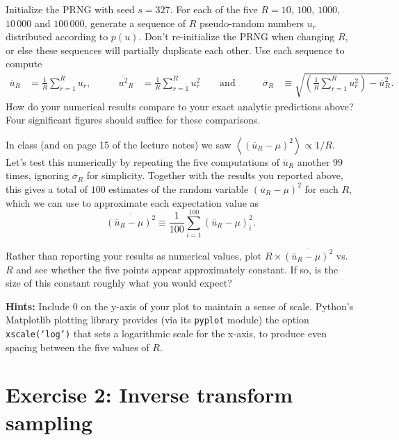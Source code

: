 \documentclass[12 pt]{article} %
\newcommand{\ubar}{\ensuremath{\overline u} }
\newcommand{\sibar}{\ensuremath{\overline\sigma} }
\newcommand{\vev}[1]{\ensuremath{\left\langle #1 \right\rangle} }
\newcommand{\showmarks}[1]{\rightline{\texttt{[#1 marks]}}} %
\begin{document}
Initialize the PRNG with seed $s = 327$.
For each of the five $R = 10$, $100$, $1000$, $10\,000$ and $100\,000$, generate a sequence of $R$ pseudo-random numbers $u_r$ distributed according to $p(u)$.
Don't re-initialize the PRNG when changing $R$, or else these sequences will partially duplicate each other.
Use each sequence to compute
\begin{align}
  \label{eq:mean}
  \ubar_R & = \frac{1}{R} \sum_{r = 1}^R u_r, \qquad &
  \overline{u^2}_R & = \frac{1}{R} \sum_{r = 1}^R u_r^2 \qquad \mbox{and} \qquad &
  \sibar_R & \equiv \sqrt{\left(\frac{1}{R} \sum_{r = 1}^R u_r^2\right) - \ubar_R^2}.
\end{align}
How do your numerical results compare to your exact analytic predictions above?
Four significant figures should suffice for these comparisons.

\showmarks{5}

In class (and on page 15 of the lecture notes) we saw $\displaystyle \vev{\left(\ubar_R - \mu\right)^2} \propto 1 / R$.
Let's test this numerically by repeating the five computations of $\ubar_R$ another $99$ times, ignoring $\sibar_R$ for simplicity.
Together with the results you reported above, this gives a total of $100$ estimates of the random variable $\left(\ubar_R - \mu\right)^2$ for each $R$, which we can use to approximate each expectation value as
\begin{equation}
  \overline{\left(\ubar_R - \mu\right)^2} \equiv \frac{1}{100} \sum_{i = 1}^{100} \left(\ubar_R - \mu\right)_i^2.
\end{equation}

Rather than reporting your results as numerical values, plot $R \times \overline{\left(\ubar_R - \mu\right)^2}$ vs.\ $R$ and see whether the five points appear approximately constant.
If so, is the size of this constant roughly what you would expect?

\textbf{Hints:} Include $0$ on the y-axis of your plot to maintain a sense of scale.
Python's Matplotlib plotting library provides (via its \texttt{pyplot} module) the option \texttt{xscale(`log')} that sets a logarithmic scale for the x-axis, to produce even spacing between the five values of $R$.

\showmarks{8}
\vfill



\newpage %
\section*{Exercise 2: Inverse transform sampling}
\end{document}
